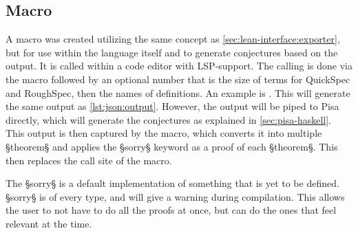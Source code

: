 \vspace{-0.7cm}

\subsection{Macro}\label{sec:lean-interface:macro}

A macro was created utilizing the same concept as \cref{sec:lean-interface:exporter}, but for use within the language itself and to generate conjectures based on the output.
It is called within a code editor with LSP-support.
The calling is done via the macro  followed by an optional number that is the size of terms for QuickSpec and RoughSpec, then the names of definitions.
An example is .
This will generate the same output as \cref{lst:json:output}.
However, the output will be piped to Pisa directly, which will generate the conjectures as explained in \cref{sec:pisa-haskell}.
This output is then captured by the macro, which converts it into multiple §theorem§ and applies the §sorry§ keyword as a proof of each §theorem§.
This then replaces the call site of the macro.

The §sorry§ is a default implementation of something that is yet to be defined.
§sorry§ is of every type, and will give a warning during compilation.
This allows the user to not have to do all the proofs at once, but can do the ones that feel relevant at the time.
